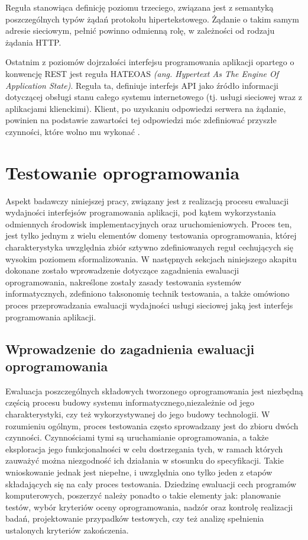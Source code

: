 Reguła stanowiąca definicję poziomu trzeciego, związana jest z semantyką poszczególnych typów żądań protokołu hipertekstowego. Żądanie o takim samym adresie sieciowym, pełnić powinno odmienną rolę, w zależności od rodzaju żądania HTTP.

Ostatnim z poziomów dojrzałości interfejsu programowania aplikacji opartego o konwencję REST jest reguła HATEOAS \textit{(ang. Hypertext As The Engine Of Application State)}. Reguła ta, definiuje interfejs API jako źródło informacji dotyczącej obsługi stanu całego systemu internetowego (tj. usługi sieciowej wraz z aplikacjami klienckimi). Klient, po uzyskaniu odpowiedzi serwera na żądanie, powinien na podstawie zawartości tej odpowiedzi móc zdefiniować przyszłe czynności, które wolno mu wykonać \cite{webber2010rest}.  

\section{Testowanie oprogramowania}
Aspekt badawczy niniejszej pracy, związany jest z realizacją procesu ewaluacji wydajności interfejsów programowania aplikacji, pod kątem wykorzystania odmiennych środowisk implementacyjnych oraz uruchomieniowych. Proces ten, jest tylko jednym z wielu elementów domeny testowania oprogramowania, której charakterystyka uwzględnia zbiór sztywno zdefiniowanych reguł cechujących się wysokim poziomem sformalizowania. W następnych sekcjach niniejszego akapitu dokonane zostało wprowadzenie dotyczące zagadnienia ewaluacji oprogramowania, nakreślone zostały zasady testowania systemów informatycznych, zdefiniono taksonomię technik testowania, a także omówiono proces przeprowadzania ewaluacji wydajności usługi sieciowej jaką jest interfejs programowania aplikacji. 
\subsection*{Wprowadzenie do zagadnienia ewaluacji oprogramowania}
Ewaluacja poszczególnych składowych tworzonego oprogramowania jest niezbędną częścią procesu budowy systemu informatycznego,niezależnie od jego charakterystyki, czy też wykorzystywanej do jego budowy technologii. W rozumieniu ogólnym, proces testowania często sprowadzany jest do zbioru dwóch czynności. Czynnościami tymi są uruchamianie oprogramowania, a także eksploracja jego funkcjonalności w celu dostrzegania tych, w ramach których zauważyć można niezgodność ich działania w stosunku do specyfikacji. Takie wnioskowanie jednak jest niepełne, i uwzględnia ono tylko jeden z etapów składających się na cały proces testowania. Dziedzinę ewaluacji cech programów komputerowych, poszerzyć należy ponadto o takie elementy jak: planowanie testów, wybór kryteriów oceny oprogramowania, nadzór oraz kontrolę realizacji badań, projektowanie przypadków testowych, czy też analizę spełnienia ustalonych kryteriów zakończenia.

